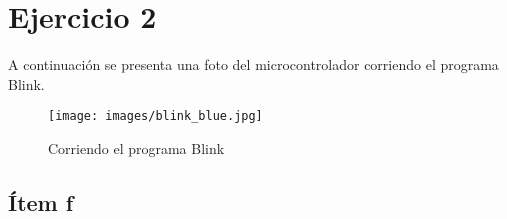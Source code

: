 \documentclass[micros_g1_main.tex]{subfiles}
\begin{document}
\section{Ejercicio 2}

A continuación se presenta una foto del microcontrolador corriendo el programa Blink. 
	\begin{figure}[H]
		\centering
		\texttt{[image: images/blink\_blue.jpg]}
		\caption{Corriendo el programa Blink} \label{fig:cct}
	\end{figure}

\subsection{Ítem f}
\end{document}
